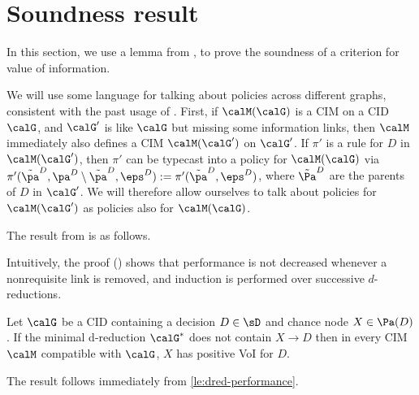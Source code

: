 







\clearpage
\section{Soundness result} \label{app:soundness}
\pagestyle{plain}
\renewcommand*{\thepage}{A-\arabic{page}}


In this section, we use a lemma from \citet{nilsson2000evaluating}, 
to prove the soundness of a criterion for value of information.

We will use some language for talking about policies across different graphs, %
consistent with the past usage of \citet{nilsson2000evaluating}.
First, if $\calM(\calG)$ is a CIM on a CID $\calG$, and $\calG'$ is like $\calG$ but missing some information links, then $\calM$ immediately also defines a CIM $\calM(\calG')$ on $\calG'$.
If $\pi'$ is a rule for $D$ in $\calM(\calG')$, then $\pi'$ can be typecast into a policy for $\calM(\calG)$ via $\pi'(\tilde\pa^D, \pa^D\setminus\tilde\pa^D, \eps^D) := \pi'(\tilde\pa^D, \eps^D)$, where $\tilde\Pa^D$ are the parents of $D$ in $\calG'$.
We will therefore allow ourselves to talk about policies for $\calM(\calG')$ as policies also for $\calM(\calG)$.

The result from \citet{nilsson2000evaluating} is as follows.



Intuitively, the proof (\citep[Theorem 3]{nilsson2000evaluating}) shows that performance is not decreased whenever a nonrequisite
link is removed, and induction is performed over successive $d$-reductions.

\begin{corollary} \label{le:materiality-soundness}
Let $\calG$ be a CID \withSR containing a decision $D \in \sD$ and chance node $X \in \Pa(D)$.
If the minimal d-reduction $\calG^*$ does not contain $X \to D$
then 
in every CIM $\calM$ compatible with $\calG$,
$X$ has positive VoI for $D$.
\end{corollary}

The result follows immediately from \cref{le:dred-performance}.



